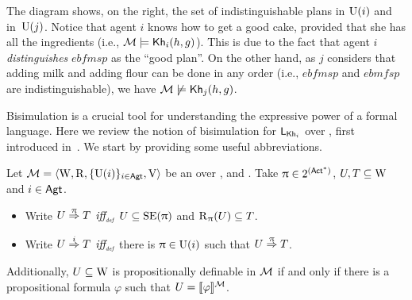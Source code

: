 \begin{example}
\medskip

The diagram shows, on the right, the set of indistinguishable plans in $\operatorname{U}(i)$ and in~$\operatorname{U}(j)$. %
Notice that agent $i$ knows how to get a good cake, provided that she has all the ingredients (i.e., $\mathcal{M}\models{\sf Kh}_i(h,g)$). This is due to the fact
that agent $i$ \emph{distinguishes} $\mathit{ebfmsp}$ as the ``good plan''. On the other hand, as $j$ considers that adding milk and adding flour can be done in any order (i.e., $\mathit{ebfmsp}$ and $\mathit{ebmfsp}$ are indistinguishable), we have $\mathcal{M}\not\models{\sf Kh}_j(h,g)$.
\end{example}

 Bisimulation is a crucial tool for understanding the expressive power of a formal language. Here we review the notion of bisimulation for $\mathsf{L}_{{\sf Kh}_i}$ over \ultss, first introduced in~\cite{AFSVQ23report}. We start by providing some useful abbreviations.

\medskip

\begin{definition}\label{def:notation}
Let $\mathcal{M}=\langle \operatorname{W},\operatorname{R},\{ \operatorname{U}(i) \}_{i\in{\rm \sf Agt}},\operatorname{V} \rangle$ be an \ults over \PROP, \ACT and \AGT. Take $\uppi \in 2^{({\rm \sf Act}^*)}$, $U, T \subseteq \operatorname{W}$ and $i \in {\rm \sf Agt}$.
\begin{itemize} \itemsep 0pt
    \item Write $U \stackrel{\uppi}{\Rightarrow} T$ $\mbox{\it iff}_{\mbox{\tiny\it def}}$ $U \subseteq \operatorname{SE}(\uppi)$ and $\operatorname{R}_{\uppi}(U) \subseteq T$.

    \item Write $U \stackrel{i}{\Rightarrow} T$ $\mbox{\it iff}_{\mbox{\tiny\it def}}$ there is $\uppi \in \operatorname{U}(i)$ such that $U \stackrel{\uppi}{\Rightarrow} T$.
\end{itemize}
Additionally, $U \subseteq \operatorname{W}$ is propositionally definable in $\mathcal{M}$ if and only if there is a propositional formula $\varphi$ such that $U = \llbracket \varphi \rrbracket^{\mathcal{M}}$.
\end{definition}

\medskip

